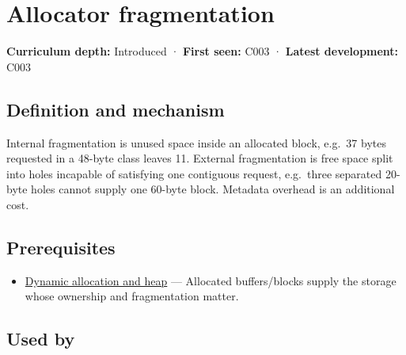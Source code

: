 \hypertarget{appendix-a7c50686d81f}{}\label{referencestart:appendix-a7c50686d81f}
\section{Allocator fragmentation}\label{appendix-a7c50686d81f-allocator-fragmentation}

\hypertarget{appendix-a7c50686d81f-allocator-fragmentation}{}

\textbf{Curriculum depth:} Introduced · \textbf{First seen:} C003 · \textbf{Latest development:} C003

\begin{allmightroledefinition}

\subsection{Definition and mechanism}\label{appendix-a7c50686d81f-definition-and-mechanism}

\hypertarget{appendix-a7c50686d81f-definition-and-mechanism}{}

Internal fragmentation is unused space inside an allocated block, e.g.~37 bytes requested in a 48-byte class leaves 11. External fragmentation is free space split into holes incapable of satisfying one contiguous request, e.g.~three separated 20-byte holes cannot supply one 60-byte block. Metadata overhead is an additional cost.

\end{allmightroledefinition}

\subsection{Prerequisites}\label{appendix-a7c50686d81f-prerequisites}

\hypertarget{appendix-a7c50686d81f-prerequisites}{}

\begin{itemize}
\tightlist
\item
  \hyperref[appendix-c3480f7d9ff3]{Dynamic allocation and heap} --- Allocated buffers/blocks supply the storage whose ownership and fragmentation matter.
\end{itemize}

\subsection{Used by}\label{appendix-a7c50686d81f-used-by}

\hypertarget{appendix-a7c50686d81f-used-by}{}

